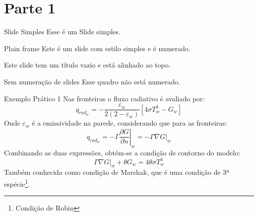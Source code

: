 \documentclass[aspectratio=169]{beamer}
\begin{document}
\section{Parte 1}
\begin{frame}{Slide Simples}
	Esse é um Slide simples.
\end{frame}
\begin{frame}[plain]{Plain frame}
	Este é um slide com estilo simples e é numerado.
\end{frame}
\begin{frame}[t]
	Este slide tem um título vazio e está alinhado ao topo.
\end{frame}
\begin{frame}[noframenumbering]{Sem numeração de slides}
	Esse quadro não está numerado.
\end{frame}
\begin{frame}{Exemplo Prático 1}
	Nas fronteiras o fluxo radiativo é avaliado por:
	\begin{equation}
	q_{rad_{w}} = - \frac{\varepsilon_w}{2(2 - \varepsilon_w)}\left[4\sigma T^{4}_{w} - G_w\right]
	\end{equation}
	Onde $\varepsilon_w$ é a emissividade na parede, considerando que para as fronteiras:
	\begin{equation}
	q_{rad_{w}} = - \Gamma \left.\frac{\partial G}{\partial n}\right|_w = -\Gamma\nabla G|_w
	\end{equation}
	Combinando as duas expressões, obtém-se a condição de contorno do modelo:
	\begin{equation}
	\Gamma\nabla G|_w + \theta G_w = 4\theta\sigma T^{4}_{w}
	\end{equation}
	Também conhecida como condição de Marshak, que é uma condição de 3ª espécie\footnote{Condição de Robin}.
\end{frame}
\end{document}
